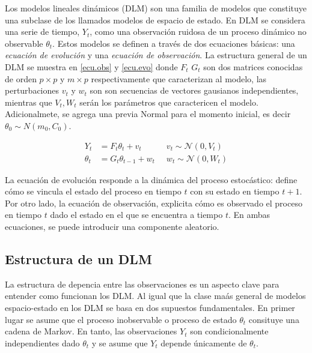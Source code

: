 \documentclass[12pt]{article}\usepackage[]{graphicx}\usepackage[]{color}
\begin{document}
%

Los modelos lineales dinámicos (DLM) son una familia de modelos que constituye una subclase de los llamados modelos de espacio de estado. En DLM se considera una serie de tiempo, $Y_t$, como una observación ruidosa de un proceso dinámico no observable $\theta_t$. Estos modelos se definen a través de dos ecuaciones básicas: una \textit{ecuación de evolución} y una \textit{ecuación de observación}. La estructura general de un DLM se muestra en \eqref{ecu.obs} y \eqref{ecu.evo} donde $F_t$ $G_t$ son dos matrices conocidas de orden $p\times p$ y $m\times p$ respectivamente que caracterizan al modelo, las perturbaciones $v_t$ y $w_t$ son son secuencias de vectores gausianos independientes, mientras que $V_t,W_t$ serán los parámetros que caractericen el modelo. Adicionalmete, se agrega una previa Normal para el momento inicial, es decir $\theta_0 \sim N(m_0, C_0)$. 

\begin{eqnarray}
\label{ecu.obs} Y_t&= F_t\theta_t + v_t  \;&\;  v_t \sim \mathcal{N}(0,V_t) \\
\label{ecu.evo} \theta_t &= G_t \theta_{t-1} + w_t \;&\; w_t \sim \mathcal{N}(0,W_t)
\end{eqnarray} 

La ecuación de evolución responde a la dinámica del proceso estocástico: define cómo se vincula el estado del proceso en tiempo $t$ con su estado en tiempo $t+1$. Por otro lado, la ecuación de observación, explicita cómo es observado el proceso en tiempo $t$ dado el estado en el que se encuentra a tiempo $t$. En ambas ecuaciones, se puede introducir una componente aleatorio. 

\subsection{Estructura de un DLM}

La estructura de depencia entre las observaciones es un aspecto clave para entender como funcionan los DLM. Al igual que la clase maás general de modelos espacio-estado en los DLM se basa en dos supuestos fundamentales. En primer lugar se asume  que el proceso inobservable o proceso de estado $\theta_t$ consituye una cadena de Markov.  En tanto, las observaciones $Y_t$ son condicionalmente independientes dado $\theta_t$ y se asume que $Y_t$ depende únicamente de $\theta_t$. 
\end{document}
